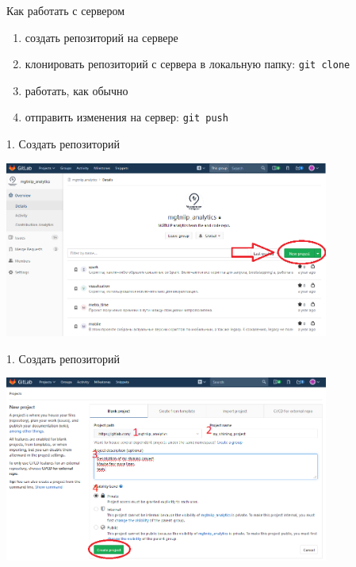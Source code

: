 \documentclass[presentation]{beamer}
\begin{document}
\begin{frame}[fragile,label={sec:orge1958d5}]{Как работать с сервером}
 \begin{enumerate}
\item создать репозиторий на сервере
\item клонировать репозиторий с сервера в локальную папку: \texttt{git clone}
\item работать, как обычно
\item отправить изменения на сервер: \texttt{git push}
\end{enumerate}
\end{frame}

\begin{frame}[label={sec:org6373914}]{1. Создать репозиторий}
\begin{center}
\includegraphics[width=0.8\textwidth]{./01_vcs_03_remote_create_repo.PNG}
\end{center}
\end{frame}

\begin{frame}[label={sec:orgea4a16a}]{1. Создать репозиторий}
\begin{center}
\includegraphics[width=0.8\textwidth]{./01_vcs_03_remote_create_repo_2.PNG}
\end{center}
\end{frame}
\end{document}
